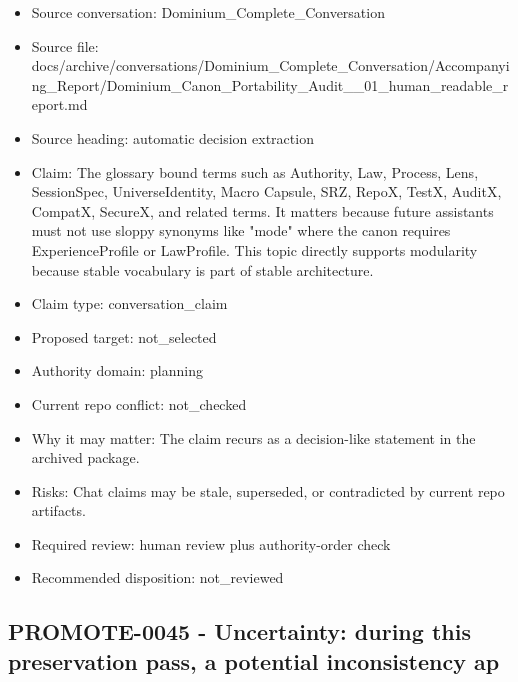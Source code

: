 \documentclass[11pt,a4paper]{report}
\begin{document}
\begin{itemize}
\item Source conversation: Dominium\_Complete\_Conversation
\item Source file: docs/archive/conversations/Dominium\_Complete\_Conversation/Accompanying\_Report/Dominium\_Canon\_Portability\_Audit\_\_01\_human\_readable\_report.md
\item Source heading: automatic decision extraction
\item Claim: The glossary bound terms such as Authority, Law, Process, Lens, SessionSpec, UniverseIdentity, Macro Capsule, SRZ, RepoX, TestX, AuditX, CompatX, SecureX, and related terms. It matters because future assistants must not use sloppy synonyms like "mode" where the canon requires ExperienceProfile or LawProfile. This topic directly supports modularity because stable vocabulary is part of stable architecture.
\item Claim type: conversation\_claim
\item Proposed target: not\_selected
\item Authority domain: planning
\item Current repo conflict: not\_checked
\item Why it may matter: The claim recurs as a decision-like statement in the archived package.
\item Risks: Chat claims may be stale, superseded, or contradicted by current repo artifacts.
\item Required review: human review plus authority-order check
\item Recommended disposition: not\_reviewed
\end{itemize}

\subsection{PROMOTE-0045 - Uncertainty: during this preservation pass, a potential inconsistency ap}
\end{document}
